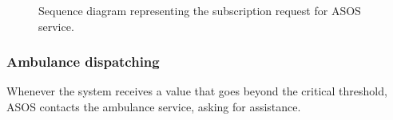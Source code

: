             \begin{figure}[H]
                \centering
                \caption{Sequence diagram representing the subscription request for ASOS service.}
                \label{fig:ASOS-seq-diagram1}
            \end{figure}
            
        \subsubsection{Ambulance dispatching}
                Whenever the system receives a value that goes beyond the critical threshold, ASOS contacts the ambulance service, asking for assistance.
                
